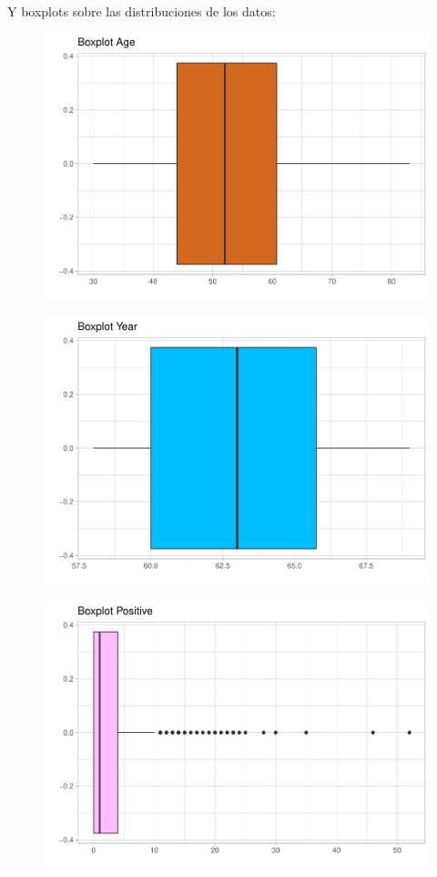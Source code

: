 \newpage

Y boxplots sobre las distribuciones de los datos:
\begin{figure}[H]\includegraphics[width=.9\linewidth]{img/EDA2_files/figure-latex/unnamed-chunk-11-1} \caption{}\end{figure}

\begin{figure}[H]\includegraphics[width=.9\linewidth]{img/EDA2_files/figure-latex/unnamed-chunk-11-2} \caption{}\end{figure}

\begin{figure}[H]\includegraphics[width=.9\linewidth]{img/EDA2_files/figure-latex/unnamed-chunk-11-3} \caption{}\end{figure}

